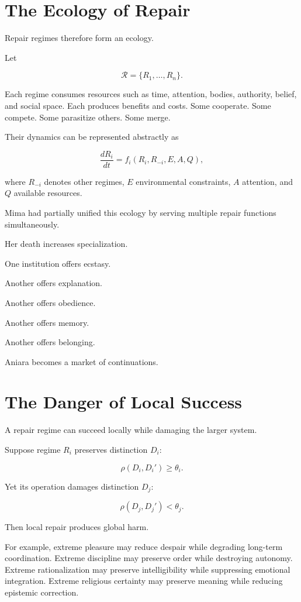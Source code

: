 \documentclass[11pt,oneside]{book}
\theoremstyle{definition}
\theoremstyle{remark}
\begin{document}
\section{The Ecology of Repair}

Repair regimes therefore form an ecology.

Let

\[
\mathcal R
=
\{R_1,\ldots,R_n\}.
\]

Each regime consumes resources such as time, attention, bodies, authority, belief, and social space. Each produces benefits and costs. Some cooperate. Some compete. Some parasitize others. Some merge.

Their dynamics can be represented abstractly as

\[
\frac{dR_i}{dt}
=
f_i(
R_i,
R_{-i},
E,
A,
Q
),
\]

where \(R_{-i}\) denotes other regimes, \(E\) environmental constraints, \(A\) attention, and \(Q\) available resources.

Mima had partially unified this ecology by serving multiple repair functions simultaneously.

Her death increases specialization.

One institution offers ecstasy.

Another offers explanation.

Another offers obedience.

Another offers memory.

Another offers belonging.

Aniara becomes a market of continuations.

\section{The Danger of Local Success}

A repair regime can succeed locally while damaging the larger system.

Suppose regime \(R_i\) preserves distinction \(D_i\):

\[
\rho(D_i,D_i')\geq\theta_i.
\]

Yet its operation damages distinction \(D_j\):

\[
\rho(D_j,D_j')<\theta_j.
\]

Then local repair produces global harm.

For example, extreme pleasure may reduce despair while degrading long-term coordination. Extreme discipline may preserve order while destroying autonomy. Extreme rationalization may preserve intelligibility while suppressing emotional integration. Extreme religious certainty may preserve meaning while reducing epistemic correction.
\end{document}

